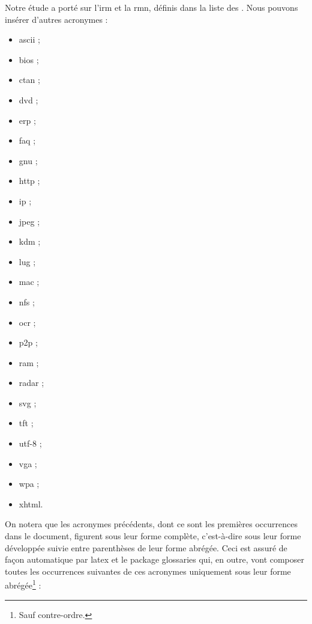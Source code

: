 \documentclass[12pt,space=onehalf,version=final]{yathesis}
\begin{document}
Notre étude a porté sur l'\gls{irm} et la \gls{rmn}, définis dans la
liste des . Nous pouvons insérer d'autres
acronymes :
\begin{itemize}
\item \gls{ascii} ;
\item \gls{bios} ;
\item \gls{ctan} ;
\item \gls{dvd} ;
\item \gls{erp} ;
\item \gls{faq} ;
\item \gls{gnu} ;
\item \gls{http} ;
\item \gls{ip} ;
\item \gls{jpeg} ;
\item \gls{kdm} ;
\item \gls{lug} ;
\item \gls{mac} ;
\item \gls{nfs} ;
\item \gls{ocr} ;
\item \gls{p2p} ;
\item \gls{ram} ;
\item \gls{radar} ;
\item \gls{svg} ;
\item \gls{tft} ;
\item \gls{utf-8} ;
\item \gls{vga} ;
\item \gls{wpa} ;
\item \gls{xhtml}.
\end{itemize}
On notera que les acronymes précédents, dont ce sont les premières
occurrences dans le document, figurent sous leur forme complète,
c'est-à-dire sous leur forme développée suivie entre parenthèses de
leur forme abrégée. Ceci est assuré de façon automatique par
\gls{latex} et le package \textsf{glossaries} qui, en outre, vont
composer toutes les occurrences suivantes de ces acronymes
uniquement sous leur forme abrégée\footnote{Sauf contre-ordre.} :
\end{document}
